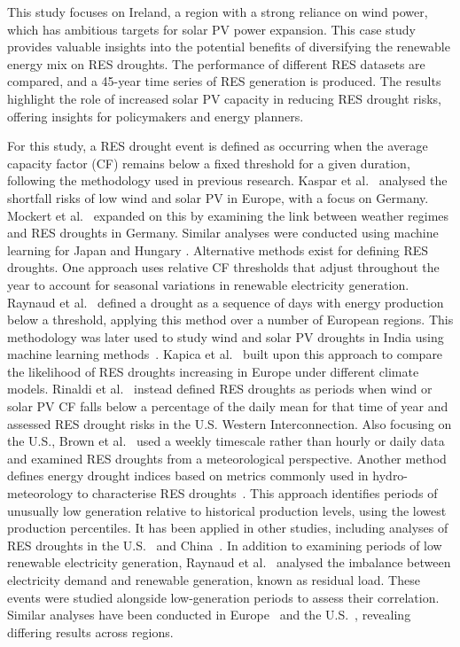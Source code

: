 \documentclass[preprint, 12pt]{elsarticle}
\begin{document}
This study focuses on Ireland, a region with a strong reliance on wind power, which has ambitious targets for solar PV power expansion. This case study provides valuable insights into the potential benefits of diversifying the renewable energy mix on RES droughts. The performance of different RES datasets are compared, and a 45-year time series of RES generation is produced. The results highlight the role of increased solar PV capacity in reducing RES drought risks, offering insights for policymakers and energy planners.

For this study, a RES drought event is defined as occurring when the average capacity factor (CF) remains below a fixed threshold for a given duration, following the methodology used in previous research. Kaspar et al.~\citep{kaspar2019drought} analysed the shortfall risks of low wind and solar PV in Europe, with a focus on Germany. Mockert et al.~\citep{mockert2023drought} expanded on this by examining the link between weather regimes and RES droughts in Germany. Similar analyses were conducted using machine learning for Japan \citep{ohba2022drought} and Hungary \citep{mayer2023drought}. Alternative methods exist for defining RES droughts. One approach uses relative CF thresholds that adjust throughout the year to account for seasonal variations in renewable electricity generation. Raynaud et al.~\citep{raynaud2018drought} defined a drought as a sequence of days with energy production below a threshold, applying this method over a number of European regions. This methodology was later used to study wind and solar PV droughts in India using machine learning methods~\citep{gangopadhyay2022drought}. Kapica et al.~\citep{kapica2024drought} built upon this approach to compare the likelihood of RES droughts increasing in Europe under different climate models. Rinaldi et al.~\citep{rinaldi2021drought} instead defined RES droughts as periods when wind or solar PV CF falls below a percentage of the daily mean for that time of year and assessed RES drought risks in the U.S. Western Interconnection. Also focusing on the U.S., Brown et al.~\citep{brown2021drought} used a weekly timescale rather than hourly or daily data and examined RES droughts from a meteorological perspective. Another method defines energy drought indices based on metrics commonly used in hydro-meteorology to characterise RES droughts~\citep{allen2023drought}. This approach identifies periods of unusually low generation relative to historical production levels, using the lowest production percentiles. It has been applied in other studies, including analyses of RES droughts in the U.S.~\citep{bracken2024drought} and China~\citep{lei2024drought}. In addition to examining periods of low renewable electricity generation, Raynaud et al.~\citep{raynaud2018drought} analysed the imbalance between electricity demand and renewable generation, known as residual load. These events were studied alongside low-generation periods to assess their correlation. Similar analyses have been conducted in Europe~\citep{allen2023drought} and the U.S.~\citep{bracken2024drought}, revealing differing results across regions.
\end{document}
